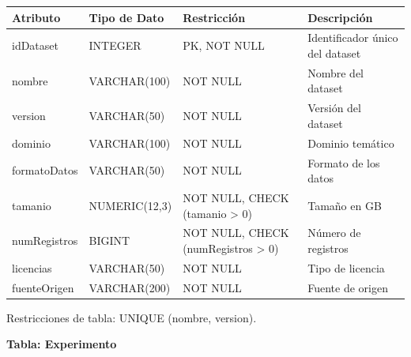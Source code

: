 \documentclass[12pt,a4paper]{article}
\begin{document}
\begin{longtable}{|>{\raggedright\arraybackslash}p{3.45cm}|>{\raggedright\arraybackslash}p{3.45cm}|>{\raggedright\arraybackslash}p{3.45cm}|>{\raggedright\arraybackslash}p{3.45cm}|}
\hline
\textbf{Atributo} & \textbf{Tipo de Dato} & \textbf{Restricción} & \textbf{Descripción} \\
\hline
idDataset & INTEGER & PK, NOT NULL & Identificador único del dataset \\
\hline
nombre & VARCHAR(100) & NOT NULL & Nombre del dataset \\
\hline
version & VARCHAR(50) & NOT NULL & Versión del dataset \\
\hline
dominio & VARCHAR(100) & NOT NULL & Dominio temático \\
\hline
formatoDatos & VARCHAR(50) & NOT NULL & Formato de los datos \\
\hline
tamanio & NUMERIC(12,3) & NOT NULL, CHECK (tamanio > 0) & Tamaño en GB \\
\hline
numRegistros & BIGINT & NOT NULL, CHECK (numRegistros > 0) & Número de registros \\
\hline
licencias & VARCHAR(50) & NOT NULL & Tipo de licencia \\
\hline
fuenteOrigen & VARCHAR(200) & NOT NULL & Fuente de origen \\
\hline
\end{longtable}

Restricciones de tabla: UNIQUE (nombre, version).

\textbf{Tabla: Experimento}
\end{document}
